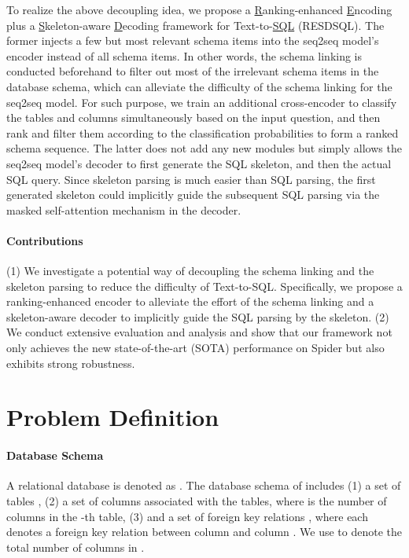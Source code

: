 \documentclass[letterpaper]{article} \usepackage{aaai23}  \usepackage{times}  \usepackage{helvet}  \usepackage{courier}  \usepackage[hyphens]{url}  \usepackage{graphicx} \urlstyle{rm} \def\UrlFont{\rm}  \usepackage{natbib}  \usepackage{caption} \frenchspacing  \setlength{\pdfpagewidth}{8.5in}  \setlength{\pdfpageheight}{11in}  \usepackage{algorithm}
\newcommand{\model}{RESDSQL}
\begin{document}
To realize the above decoupling idea, we propose a \underline{R}anking-enhanced \underline{E}ncoding plus a \underline{S}keleton-aware \underline{D}ecoding framework for Text-to-\underline{SQL} (\model). The former injects a few but most relevant schema items into the seq2seq model's encoder instead of all schema items. In other words, the schema linking is conducted beforehand to filter out most of the irrelevant schema items in the database schema, which can alleviate the difficulty of the schema linking for the seq2seq model. For such purpose, we train an additional cross-encoder to classify the tables and columns simultaneously based on the input question, and then rank and filter them according to the classification probabilities to form a ranked schema sequence. The latter does not add any new modules but simply allows the seq2seq model's decoder to first generate the SQL skeleton, and then the actual SQL query. Since skeleton parsing is much easier than SQL parsing, the first generated skeleton could implicitly guide the subsequent SQL parsing via the masked self-attention mechanism in the decoder.

\paragraph{Contributions} 
(1) We investigate a potential way of decoupling the schema linking and the skeleton parsing to reduce the difficulty of Text-to-SQL. Specifically, we propose a ranking-enhanced encoder to alleviate the effort of the schema linking and a skeleton-aware decoder to implicitly guide the SQL parsing by the skeleton. (2) We conduct extensive evaluation and analysis and show that our framework not only achieves the new state-of-the-art (SOTA) performance on Spider but also exhibits strong robustness. 

\section{Problem Definition}
\paragraph{Database Schema}
A relational database is denoted as .
The database schema  of  includes (1) a set of  tables ,  
(2) a set of columns  associated with the tables, where  is the number of columns in the -th table,
(3) and a set of foreign key relations , where each  denotes a foreign key relation between column  and column . We use  to denote the total number of columns in . 
\end{document}
